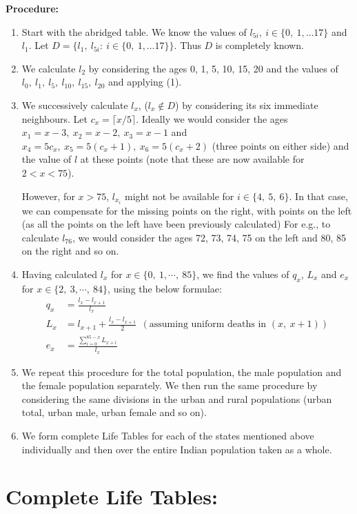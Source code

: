 \documentclass[
  14pt,
]{article}
\begin{document}
\textbf{Procedure:}\cite{johnson}

\begin{enumerate}
    \item Start with the abridged table. We know the values of $l_{5i},~i\in\{0,~1,\ldots17\}$ and $l_1$. Let $D=\{l_1,~l_{5i}: ~i\in\{0,~1,\ldots17\}\}$. Thus $D$ is completely known.
    \item We calculate $l_2$ by considering the ages 0, 1, 5, 10, 15, 20 and the values of $l_0,~l_1,~l_5,~l_{10},~l_{15},~l_{20}$ and applying (1).
    \item We successively calculate $l_x$, ($l_x\not\in D$) by considering its six immediate neighbours. Let $c_x=\lceil x/5\rceil$. Ideally we would consider the ages $x_1=x-3,~x_2=x-2,~x_3=x-1$ and $x_4=5c_x,~x_5=5(c_x+1),~x_6=5(c_x+2)$ (three points on either side) and the value of $l$ at these points (note that these are now available for $2<x<75$).
    
However, for $x> 75$, $l_{x_i}$ might not be available for $i\in\{4,~5,~6\}$. In that case, we can compensate for the missing points on the right, with points on the left (as all the points on the left have been previously calculated) For e.g., to calculate $l_{76}$, we would consider the ages 72, 73, 74, 75 on the left and 80, 85 on the right and so on.
    \item Having calculated $l_x$ for $x\in\{0,~1,\cdots,~85\}$, we find the values of $q_x$, $L_x$ and $e_x$ for $x\in\{2,~3,\cdots,~84\}$, using the below formulae:
    \begin{align*}
        q_x&=\frac{l_x-l_{x+1}}{l_x}\\
        L_x&=l_{x+1}+\frac{l_x-l_{x+1}}{2}~~(\text{assuming uniform deaths in }(x,~x+1))\\
        e_x&=\frac{\sum_{i=0}^{85-x} L_{x+i}}{l_x}
    \end{align*}
    \item We repeat this procedure for the total population, the male population and the female population separately. We then run the same procedure by considering the same divisions in the urban and rural populations (urban total, urban male, urban female and so on). 
    \item We form complete Life Tables for each of the states mentioned above individually and then over the entire Indian population taken as a whole.
\end{enumerate}

\section*{Complete Life Tables: }
\end{document}
